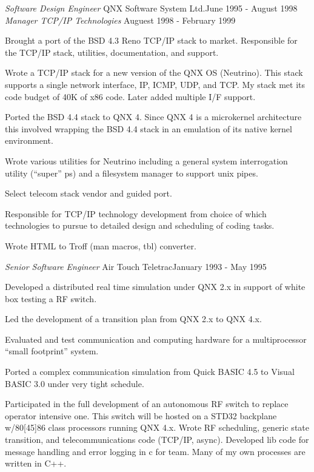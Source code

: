 \documentclass[margin]{res}
\begin{document}
\begin{resume}
                {\sl Software Design Engineer } QNX Software System Ltd.\hfill June 1995 - August 1998 \\
                {\sl Manager TCP/IP Technologies } \hfill Auguest 1998 - February 1999

                Brought a port of the BSD 4.3 Reno TCP/IP stack to
                market. Responsible for the TCP/IP stack, utilities,
                documentation, and support.

                Wrote a TCP/IP stack for a new version of the QNX
                OS (Neutrino). This stack supports a single network
                interface, IP, ICMP, UDP, and TCP. My stack met its
                code budget of 40K of x86 code. Later added multiple
                I/F support.

                Ported the BSD 4.4 stack to QNX 4. Since QNX 4 is a
                microkernel architecture this involved wrapping the
                BSD 4.4 stack in an emulation of its native kernel
                environment.

                Wrote various utilities for Neutrino including a general
                system interrogation utility (“super” ps) and a
                filesystem manager to support unix pipes.

                Select telecom stack vendor and guided port.

                Responsible for TCP/IP technology development from choice
                of which technologies to pursue to detailed design and
                scheduling of coding tasks.

                Wrote HTML to Troff (man macros, tbl) converter.

                {\sl Senior Software Engineer } Air Touch Teletrac\hfill January 1993 - May 1995

                Developed a distributed real time simulation under QNX
                2.x in support of white box testing a RF switch.

                Led the development of a transition plan from QNX 2.x
                to QNX 4.x.

                Evaluated and test communication and computing hardware
                for a multiprocessor “small footprint” system.

                Ported a complex communication simulation from Quick
                BASIC 4.5 to Visual BASIC 3.0 under very tight schedule.

                Participated in the full development of an autonomous RF
                switch to replace operator intensive one. This switch
                will be hosted on a STD32 backplane w/80[45]86 class
                processors running QNX 4.x. Wrote RF scheduling, generic
                state transition, and telecommunications code (TCP/IP,
                async). Developed lib code for message handling and
                error logging in c for team. Many of my own processes
                are written in C++.


\end{resume}
\end{document}

